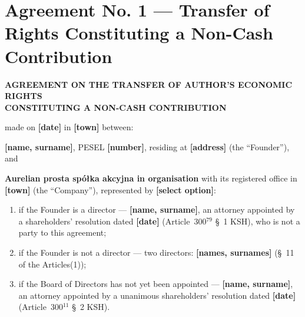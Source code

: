 \documentclass[12pt,a4paper]{report}
\newcounter{paragraf}
\newcommand{\field}[1]{\textbf{[#1]}}
\newcommand{\CompanyFull}{Aurelian prosta spółka akcyjna}
\newcommand{\USen}[1]{\S~#1 of the Articles}
\begin{document}
\chapter*{Agreement No. 1 --- Transfer of Rights Constituting a Non-Cash Contribution}
\setcounter{paragraf}{0}

\begin{center}
{\Large\bfseries AGREEMENT ON THE TRANSFER OF AUTHOR'S ECONOMIC RIGHTS\\ CONSTITUTING A NON-CASH CONTRIBUTION}\par
\vspace{0.4cm}
\end{center}

made on \field{date} in \field{town} between:

\textbf{\field{name, surname}}, PESEL \field{number}, residing at \field{address} (the ``Founder''), and

\textbf{\CompanyFull{} in organisation} with its registered office in \field{town} (the ``Company''), represented by \field{select option}:
\begin{enumerate}[label=\alph*)]
  \item if the Founder is a director --- \field{name, surname}, an attorney appointed by a shareholders' resolution dated \field{date} (Article~300$^{79}$ \S~1 KSH), who is not a party to this agreement;
  \item if the Founder is not a director --- two directors: \field{names, surnames} (\USen{11}(1));
  \item if the Board of Directors has not yet been appointed --- \field{name, surname}, an attorney appointed by a unanimous shareholders' resolution dated \field{date} (Article~300$^{11}$ \S~2 KSH).
\end{enumerate}
\end{document}
